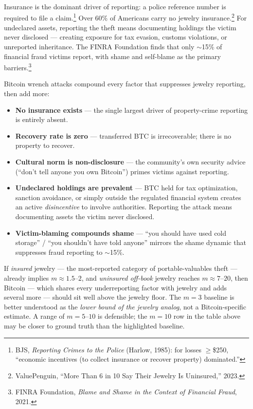 \documentclass[a4paper,11pt]{article}
\begin{document}
{\footnotesize Insurance is the dominant driver of reporting: a police reference number is required to file a claim.\footnote{BJS, \textit{Reporting Crimes to the Police} (Harlow, 1985): for losses $\geq$\$250, ``economic incentives (to collect insurance or recover property) dominated.''} Over 60\% of Americans carry no jewelry insurance.\footnote{ValuePenguin, ``More Than 6 in 10 Say Their Jewelry Is Uninsured,'' 2023.} For undeclared assets, reporting the theft means documenting holdings the victim never disclosed --- creating exposure for tax evasion, customs violations, or unreported inheritance. The FINRA Foundation finds that only $\sim$15\% of financial fraud victims report, with shame and self-blame as the primary barriers.\footnote{FINRA Foundation, \textit{Blame and Shame in the Context of Financial Fraud}, 2021.}}

\smallskip
\noindent Bitcoin wrench attacks compound every factor that suppresses jewelry reporting, then add more:

\begin{itemize}[nosep,leftmargin=1.5em]
  \item \textbf{No insurance exists} --- the single largest driver of property-crime reporting is entirely absent.
  \item \textbf{Recovery rate is zero} --- transferred BTC is irrecoverable; there is no property to recover.
  \item \textbf{Cultural norm is non-disclosure} --- the community's own security advice (``don't tell anyone you own Bitcoin'') primes victims against reporting.
  \item \textbf{Undeclared holdings are prevalent} --- BTC held for tax optimization, sanction avoidance, or simply outside the regulated financial system creates an active \textit{disincentive} to involve authorities. Reporting the attack means documenting assets the victim never disclosed.
  \item \textbf{Victim-blaming compounds shame} --- ``you should have used cold storage'' / ``you shouldn't have told anyone'' mirrors the shame dynamic that suppresses fraud reporting to $\sim$15\%.
\end{itemize}

\noindent If \textit{insured} jewelry --- the most-reported category of portable-valuables theft --- already implies $m \approx 1.5$--$2$, and \textit{uninsured off-book} jewelry reaches $m \approx 7$--$20$, then Bitcoin --- which shares every underreporting factor with jewelry and adds several more --- should sit well above the jewelry floor. The $m = 3$ baseline is better understood as the \textit{lower bound of the jewelry analog}, not a Bitcoin-specific estimate. A range of $m = 5$--$10$ is defensible; the $m = 10$ row in the table above may be closer to ground truth than the highlighted baseline.
\end{document}
